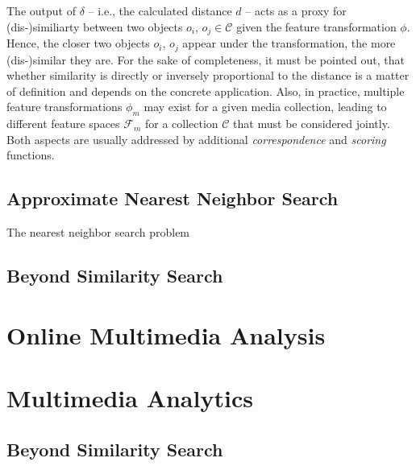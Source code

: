The output of $\delta$ -- i.e., the calculated distance $d$ -- acts as a proxy for (dis-)similiarty between two objects $o_{i}$, $o_{j} \in \mathcal{C}$ given the feature transformation $\phi$. Hence, the closer two objects $o_{i}$, $o_{j}$ appear under the transformation, the more (dis-)similar they are. For the sake of completeness, it must be pointed out, that whether similarity is directly or inversely proportional to the distance is a matter of definition and depends on the concrete application. Also, in practice, multiple feature transformations $\phi_m$ may exist for a given media collection, leading to different feature spaces $\mathcal{F}_m$ for a collection $\mathcal{C}$ that must be considered jointly. Both aspects are usually addressed by additional \emph{correspondence} and \emph{scoring} functions.


\subsection{Approximate Nearest Neighbor Search}
The nearest neighbor search problem 



\subsection{Beyond Similarity Search}

\section{Online Multimedia Analysis}

\section{Multimedia Analytics}

\subsection{Beyond Similarity Search}

